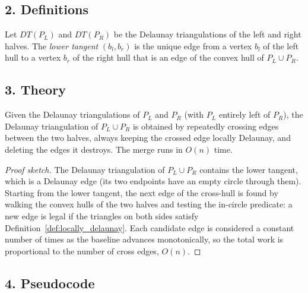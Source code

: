 \subsection{2. Definitions}

\begin{definition}\label{def:lower_tangent}
Let $DT(P_L)$ and $DT(P_R)$ be the Delaunay triangulations of the left and
right halves. The \emph{lower tangent} $(b_l, b_r)$ is the unique edge from a
vertex $b_l$ of the left hull to a vertex $b_r$ of the right hull that is an
edge of the convex hull of $P_L \cup P_R$.
\end{definition}

\subsection{3. Theory}

\begin{theorem}\label{thm:delaunay_merge}
Given the Delaunay triangulations of $P_L$ and $P_R$ (with $P_L$ entirely left
of $P_R$), the Delaunay triangulation of $P_L \cup P_R$ is obtained by
repeatedly crossing edges between the two halves, always keeping the crossed
edge locally Delaunay, and deleting the edges it destroys. The merge runs in
$O(n)$ time.
\end{theorem}

\begin{proof}[Proof sketch]
The Delaunay triangulation of $P_L \cup P_R$ contains the lower tangent, which
is a Delaunay edge (its two endpoints have an empty circle through them).
Starting from the lower tangent, the next edge of the cross-hull is found by
walking the convex hulls of the two halves and testing the in-circle predicate:
a new edge is legal if the triangles on both sides satisfy
Definition~\ref{def:locally_delaunay}. Each candidate edge is considered a
constant number of times as the baseline advances monotonically, so the total
work is proportional to the number of cross edges, $O(n)$.
\end{proof}

\subsection{4. Pseudocode}

